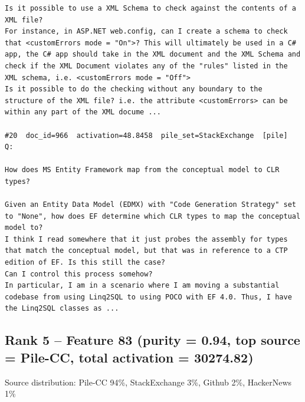 \begin{verbatim}
Is it possible to use a XML Schema to check against the contents of a XML file?
For instance, in ASP.NET web.config, can I create a schema to check that <customErrors mode = "On">? This will ultimately be used in a C# app, the C# app should take in the XML document and the XML Schema and check if the XML Document violates any of the "rules" listed in the XML schema, i.e. <customErrors mode = "Off">
Is it possible to do the checking without any boundary to the structure of the XML file? i.e. the attribute <customErrors> can be within any part of the XML docume ...

#20  doc_id=966  activation=48.8458  pile_set=StackExchange  [pile]
Q:

How does MS Entity Framework map from the conceptual model to CLR types?

Given an Entity Data Model (EDMX) with "Code Generation Strategy" set to "None", how does EF determine which CLR types to map the conceptual model to? 
I think I read somewhere that it just probes the assembly for types that match the conceptual model, but that was in reference to a CTP edition of EF. Is this still the case?
Can I control this process somehow?
In particular, I am in a scenario where I am moving a substantial codebase from using Linq2SQL to using POCO with EF 4.0. Thus, I have the Linq2SQL classes as ...

\end{verbatim}

\subsection*{Rank 5 -- Feature 83 (purity = 0.94, top source = Pile-CC, total activation = 30274.82)}

Source distribution: Pile-CC 94\%, StackExchange 3\%, Github 2\%, HackerNews 1\%

